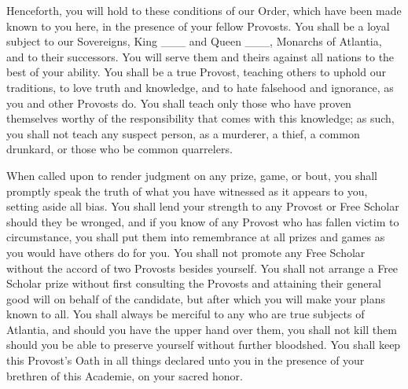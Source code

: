 \documentclass[avery5371,grid]{flashcards}
\begin{document}
\begin{flashcard}{
    \begin{footnotesize}
    \begin{minipage}{\cardinnerwidth}
    \normalfont
        Henceforth, you will hold to these conditions of our Order, which have been made known to you here, in the presence of your fellow Provosts.
        You shall be a loyal subject to our Sovereigns, King \_\_\_ and Queen \_\_\_, Monarchs of Atlantia, and to their successors.
        You will serve them and theirs against all nations to the best of your ability.
        You shall be a true Provost, teaching others to uphold our traditions, to love truth and knowledge, and to hate falsehood and ignorance, as you and other Provosts do.
        You shall teach only those who have proven themselves worthy of the responsibility that comes with this knowledge; as such, you shall not teach any suspect person, as a murderer, a thief, a common drunkard, or those who be common quarrelers.
        \end{minipage}
    \end{footnotesize}
}
\begin{footnotesize}
When called upon to render judgment on any prize, game, or bout, you shall promptly speak the truth of what you have witnessed as it appears to you, setting aside all bias.
You shall lend your strength to any Provost or Free Scholar should they be wronged, and if you know of any Provost who has fallen victim to circumstance, you shall put them into remembrance at all prizes and games as you would have others do for you.
You shall not promote any Free Scholar without the accord of two Provosts besides yourself.
You shall not arrange a Free Scholar prize without first consulting the Provosts and attaining their general good will on behalf of the candidate, but after which you will make your plans known to all.
You shall always be merciful to any who are true subjects of Atlantia, and should you have the upper hand over them, you shall not kill them should you be able to preserve yourself without further bloodshed.
You shall keep this Provost's Oath in all things declared unto you in the presence of your brethren of this Academie, on your sacred honor.
\end{footnotesize}
\end{flashcard}
\end{document}
